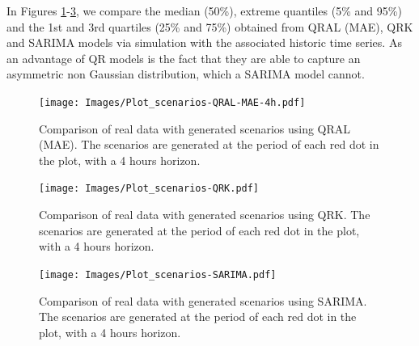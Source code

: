 In Figures \ref{fig:scenarios-qral}-\ref{fig:scenarios-sarima}, we compare the median (50\%), extreme quantiles (5\% and 95\%) and the 1st and 3rd quartiles (25\% and 75\%) obtained from QRAL (MAE), QRK and SARIMA models via simulation with the associated historic time series. As an advantage of QR models is the fact that they are able to capture an asymmetric non Gaussian distribution, which a SARIMA model cannot.  
\begin{figure}[ht]
	\centering
	\texttt{[image: Images/Plot\_scenarios-QRAL-MAE-4h.pdf]}
	\caption{Comparison of real data with generated scenarios using QRAL (MAE). The scenarios are generated at the period of each red dot in the plot, with a 4 hours horizon. }
	\label{fig:scenarios-qral}
\end{figure}
\begin{figure}[ht]
	\centering
	\texttt{[image: Images/Plot\_scenarios-QRK.pdf]}
	\caption{Comparison of real data with generated scenarios using QRK. The scenarios are generated at the period of each red dot in the plot, with a 4 hours horizon.}
	\label{fig:scenarios-qrk}
\end{figure}
\begin{figure}[h]
	\centering
	\texttt{[image: Images/Plot\_scenarios-SARIMA.pdf]}
	\caption{Comparison of real data with generated scenarios using SARIMA. The scenarios are generated at the period of each red dot in the plot, with a 4 hours horizon.}
	\label{fig:scenarios-sarima}
\end{figure}


